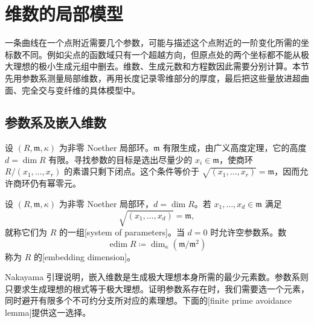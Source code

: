 
% 
% 
% 

\section{维数的局部模型}
\label{g5:sec:0304}

一条曲线在一个点附近需要几个参数，可能与描述这个点附近的一阶变化所需的坐标数不同。例如尖点的函数域只有一个超越方向，但原点处的两个坐标都不能从极大理想的极小生成元组中删去。维数、生成元数和方程数因此需要分别计算。本节先用参数系测量局部维数，再用长度记录零维部分的厚度，最后把这些量放进超曲面、完全交与变纤维的具体模型中。

\subsection{参数系及嵌入维数}
\label{g5:subsec:0304:01}

设 \((R,\mathfrak m,\kappa)\) 为非零 Noether 局部环。\(\mathfrak m\) 有限生成，由广义高度定理，它的高度 \(d=\dim R\) 有限。寻找参数的目标是选出尽量少的 \(x_i\in\mathfrak m\)，使商环 \(R/(x_1,\ldots,x_r)\) 的素谱只剩下闭点。这个条件等价于 \(\sqrt{(x_1,\ldots,x_r)}=\mathfrak m\)，因而允许商环仍有幂零元。

\begin{definition}
\label{g5:def:system-of-parameters}
	设 \((R,\mathfrak m,\kappa)\) 为非零 Noether 局部环，\(d=\dim R\)。若 \(x_1,\ldots,x_d\in\mathfrak m\) 满足
	\[
		\sqrt{(x_1,\ldots,x_d)}=\mathfrak m,
	\]
	就称它们为 \(R\) 的一组[system of parameters]。当 \(d=0\) 时允许空参数系。数
	\[
		\operatorname{edim}R\coloneqq
		\dim_\kappa(\mathfrak m/\mathfrak m^2)
	\]
	称为 \(R\) 的[embedding dimension]。
\end{definition}

Nakayama 引理说明，嵌入维数是生成极大理想本身所需的最少元素数。参数系则只要求生成理想的根式等于极大理想。证明参数系存在时，我们需要选一个元素，同时避开有限多个不可约分支所对应的素理想。下面的[finite prime avoidance lemma]提供这一选择。

